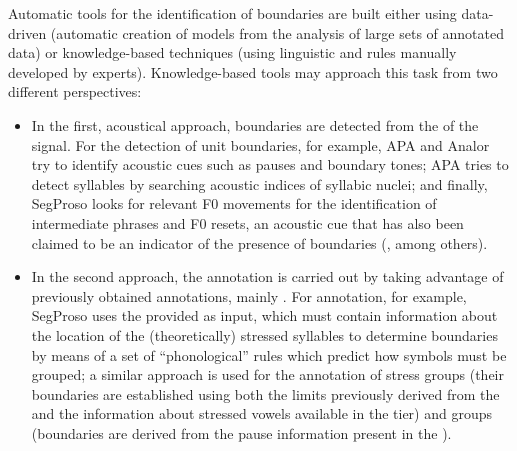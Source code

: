 \documentclass[output=paper]{langsci/langscibook}
\begin{document}
Automatic tools for the identification of  boundaries are built either using data-driven (automatic creation of models from the analysis of large sets of annotated data) or knowledge-based techniques (using linguistic and  rules manually developed by experts). Knowledge-based tools may approach this task from two different perspectives:

\begin{itemize}
\item In the first, acoustical approach,  boundaries are detected from the  of the signal. For the detection of  unit boundaries, for example, APA and Analor try to identify acoustic cues such as pauses and boundary tones; APA tries to detect syllables by searching acoustic indices of syllabic nuclei; and finally, SegProso looks for relevant F0 movements for the identification of intermediate phrases and F0 resets, an acoustic cue that has also been claimed to be an indicator of the presence of  boundaries (\citealt{Garrido1996,Garrido2001}, among others). 
 
\item In the second approach, the  annotation is carried out by taking advantage of previously obtained annotations, mainly . For  annotation, for example, SegProso uses the  provided as input, which must contain information about the location of the (theoretically) stressed syllables to determine  boundaries by means of a set of ``phonological'' rules which predict how  symbols must be grouped; a similar approach is used for the annotation of stress groups (their boundaries are established using both the  limits previously derived from the  and the information about stressed vowels available in the  tier) and  groups (boundaries are derived from the pause information present in the ).
\end{itemize}
\end{document}
